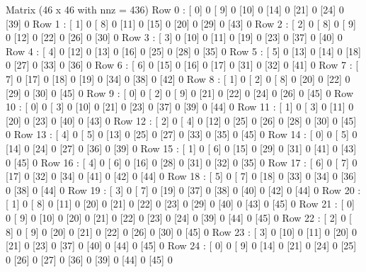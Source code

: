 Matrix  (46 x 46  with  nnz = 436)
Row 0 : [ 0]     0  [ 9]     0  [10]     0  [14]     0  [21]     0  [24]     0  [39]     0  
Row 1 : [ 1]     0  [ 8]     0  [11]     0  [15]     0  [20]     0  [29]     0  [43]     0  
Row 2 : [ 2]     0  [ 8]     0  [ 9]     0  [12]     0  [22]     0  [26]     0  [30]     0  
Row 3 : [ 3]     0  [10]     0  [11]     0  [19]     0  [23]     0  [37]     0  [40]     0  
Row 4 : [ 4]     0  [12]     0  [13]     0  [16]     0  [25]     0  [28]     0  [35]     0  
Row 5 : [ 5]     0  [13]     0  [14]     0  [18]     0  [27]     0  [33]     0  [36]     0  
Row 6 : [ 6]     0  [15]     0  [16]     0  [17]     0  [31]     0  [32]     0  [41]     0  
Row 7 : [ 7]     0  [17]     0  [18]     0  [19]     0  [34]     0  [38]     0  [42]     0  
Row 8 : [ 1]     0  [ 2]     0  [ 8]     0  [20]     0  [22]     0  [29]     0  [30]     0  [45]     0  
Row 9 : [ 0]     0  [ 2]     0  [ 9]     0  [21]     0  [22]     0  [24]     0  [26]     0  [45]     0  
Row 10 : [ 0]     0  [ 3]     0  [10]     0  [21]     0  [23]     0  [37]     0  [39]     0  [44]     0  
Row 11 : [ 1]     0  [ 3]     0  [11]     0  [20]     0  [23]     0  [40]     0  [43]     0  
Row 12 : [ 2]     0  [ 4]     0  [12]     0  [25]     0  [26]     0  [28]     0  [30]     0  [45]     0  
Row 13 : [ 4]     0  [ 5]     0  [13]     0  [25]     0  [27]     0  [33]     0  [35]     0  [45]     0  
Row 14 : [ 0]     0  [ 5]     0  [14]     0  [24]     0  [27]     0  [36]     0  [39]     0  
Row 15 : [ 1]     0  [ 6]     0  [15]     0  [29]     0  [31]     0  [41]     0  [43]     0  [45]     0  
Row 16 : [ 4]     0  [ 6]     0  [16]     0  [28]     0  [31]     0  [32]     0  [35]     0  
Row 17 : [ 6]     0  [ 7]     0  [17]     0  [32]     0  [34]     0  [41]     0  [42]     0  [44]     0  
Row 18 : [ 5]     0  [ 7]     0  [18]     0  [33]     0  [34]     0  [36]     0  [38]     0  [44]     0  
Row 19 : [ 3]     0  [ 7]     0  [19]     0  [37]     0  [38]     0  [40]     0  [42]     0  [44]     0  
Row 20 : [ 1]     0  [ 8]     0  [11]     0  [20]     0  [21]     0  [22]     0  [23]     0  [29]     0  [40]     0  [43]     0  [45]     0  
Row 21 : [ 0]     0  [ 9]     0  [10]     0  [20]     0  [21]     0  [22]     0  [23]     0  [24]     0  [39]     0  [44]     0  [45]     0  
Row 22 : [ 2]     0  [ 8]     0  [ 9]     0  [20]     0  [21]     0  [22]     0  [26]     0  [30]     0  [45]     0  
Row 23 : [ 3]     0  [10]     0  [11]     0  [20]     0  [21]     0  [23]     0  [37]     0  [40]     0  [44]     0  [45]     0  
Row 24 : [ 0]     0  [ 9]     0  [14]     0  [21]     0  [24]     0  [25]     0  [26]     0  [27]     0  [36]     0  [39]     0  [44]     0  [45]     0  
